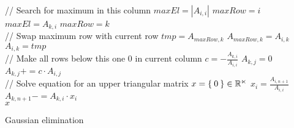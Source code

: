 \documentclass{article}
\begin{document}
\begin{preview}
    \begin{algorithm}[H]
        \begin{algorithmic}
                    \State // Search for maximum in this column
                    \State $maxEl = |A_{i,i}|$
                    \State $maxRow = i$
                            \State $maxEl = A_{k,i}$
                            \State $maxRow = k$
                        \EndIf
                    \EndFor
                    \\
                    \State // Swap maximum row with current row
                        \State $tmp = A_{maxRow,k}$
                        \State $A_{maxRow,k} = A_{i,k}$
                        \State $A_{i,k} = tmp$
                    \EndFor
                    \\
                    \State // Make all rows below this one 0 in current column
                        \State $c = -\frac{A_{k,i}}{A_{i,i}}$
                                \State $A_{k,j} = 0$
                            \Else
                                \State $A_{k,j} += c \cdot A_{i,j}$
                            \EndIf
                        \EndFor
                    \EndFor
                \EndFor
                \\
                \State // Solve equation for an upper triangular matrix
                \State $x = \Set{0} \in \mathbb{R^n}$
                    \State $x_i = \frac{A_{i,n+1}}{A_{i,i}}$
                        \State $A_{k,n+1} -= A_{k,i} \cdot x_{i}$
                    \EndFor
                \EndFor
                \\
                \State \Return $x$
            \EndFunction
        \end{algorithmic}
    \caption{Gaussian elimination}
    \label{alg:seq1}
    \end{algorithm}
\end{preview}
\end{document}
